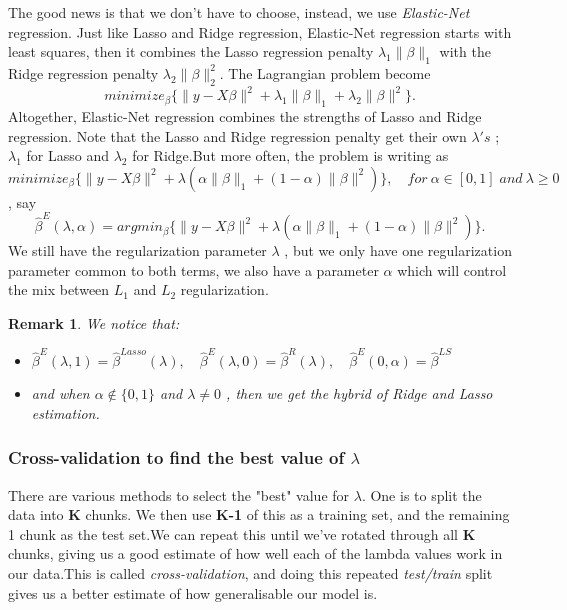 \documentclass[12pt]{report}
\renewcommand{\emph}{\textit}
\newtheorem{remarque}{Remark}[section]
\begin{document}
The good news is that we don't have to choose, instead, we use \emph{Elastic-Net} regression. Just like Lasso and Ridge regression, Elastic-Net regression starts with least squares, then it combines the Lasso regression penalty $\lambda_{1}\parallel \beta \parallel_{1}$ with the Ridge regression penalty $\lambda_{2}\parallel \beta \parallel^{2}_{2}$. The Lagrangian problem become 
$$minimize_{\beta}\{\parallel y-X\beta \parallel^{2} +\lambda_{1}\parallel \beta \parallel_{1}+\lambda_{2}\parallel \beta \parallel^{2}\}.$$
Altogether, Elastic-Net regression combines the strengths of Lasso and Ridge regression. Note that the Lasso and Ridge regression penalty get their own $\lambda's$ ; $\lambda_{1}$ for Lasso and $\lambda_{2}$ for Ridge.But more often, the problem is writing as
$$minimize_{\beta}\{\parallel y-X\beta \parallel^{2} +\lambda(\alpha \parallel \beta \parallel_{1}+(1-\alpha)\parallel \beta \parallel^{2})\},\quad for\ \alpha \in [0,1]\; and\ \lambda \geq 0$$, say
\begin{equation}
	\hat{\beta}^{E}(\lambda,\alpha)=argmin_{\beta}\{\parallel y-X\beta \parallel^{2} +\lambda(\alpha \parallel \beta \parallel_{1}+(1-\alpha)\parallel \beta \parallel^{2})\}.
\end{equation}
We still have the regularization parameter $\lambda$ , but we only have one regularization parameter common to both terms, we also have a parameter $\alpha$  which will control the mix between  $L_{1}$ and $L_{2}$ regularization. 
\begin{remarque}
	We notice that:
	\begin{itemize}
		\item $\hat{\beta}^{E}(\lambda,1)=\hat{\beta}^{Lasso}(\lambda),\quad \hat{\beta}^{E}(\lambda,0)=\hat{\beta}^{R}(\lambda),\quad \hat{\beta}^{E}(0,\alpha)=\hat{\beta}^{LS}$
		\item and when $\alpha \notin\{0,1\} $ and $\lambda \neq 0$ , then we get the hybrid of Ridge and Lasso estimation.
	\end{itemize}
\end{remarque}
\subsubsection{Cross-validation to find the best value of $\lambda$}
There are various methods to select the "best" value for $\lambda$. One is to split the data into \textbf{K} chunks. We then use \textbf{K-1} of this as a training set, and the remaining 1 chunk as the test set.We can repeat this until we've rotated through all \textbf{K} chunks, giving us a good estimate of how well each of the lambda values work in our data.This is called \emph{cross-validation}, and doing this repeated \emph{test/train} split gives us a better estimate of how generalisable our model is.
\end{document}
